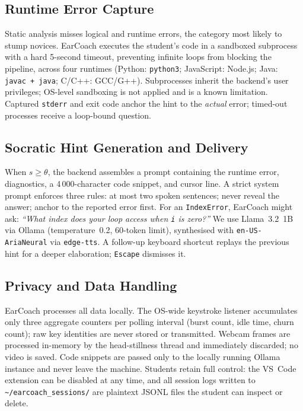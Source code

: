\documentclass[sigconf,anonymous,review]{acmart}
\begin{document}
\subsection{Runtime Error Capture}

Static analysis misses logical and runtime errors, the category most
likely to stump novices. EarCoach executes the student's code in a
sandboxed subprocess with a hard 5-second timeout, preventing infinite
loops from blocking the pipeline, across four runtimes (Python:
\texttt{python3}; JavaScript: Node.js; Java: \texttt{javac\,+\,java};
C/C++: GCC/G++). Subprocesses inherit the backend's user privileges;
OS-level sandboxing is not applied and is a known limitation.
Captured \texttt{stderr} and exit code anchor the hint to the
\emph{actual} error; timed-out processes receive a loop-bound question.

\subsection{Socratic Hint Generation and Delivery}

When $s \geq \theta$, the backend assembles a prompt containing the
runtime error, diagnostics, a 4\,000-character code snippet, and cursor
line. A strict system prompt enforces three rules: at most two spoken
sentences; never reveal the answer; anchor to the reported error first.
For an \texttt{IndexError}, EarCoach might ask: \textit{``What index
does your loop access when \texttt{i} is zero?''}
We use Llama~3.2~1B~\cite{grattafiori2024} via Ollama (temperature~0.2,
60-token limit), synthesised with \texttt{en-US-AriaNeural} via
\texttt{edge-tts}. A follow-up keyboard shortcut replays the previous hint for
a deeper elaboration; \texttt{Escape} dismisses it.

\subsection{Privacy and Data Handling}

EarCoach processes all data locally. The OS-wide keystroke listener
accumulates only three aggregate counters per polling interval (burst
count, idle time, churn count); raw key identities are never stored or
transmitted. Webcam frames are processed in-memory by the head-stillness
thread and immediately discarded; no video is saved. Code snippets are
passed only to the locally running Ollama instance and never leave the
machine. Students retain full control: the VS~Code extension can be
disabled at any time, and all session logs written to
\texttt{\textasciitilde/earcoach\_sessions/} are plaintext JSONL files
the student can inspect or delete.
\end{document}
